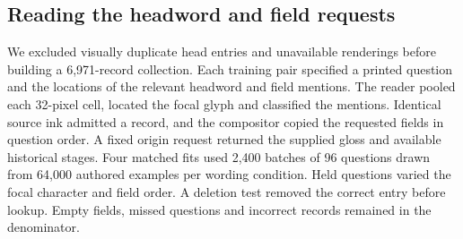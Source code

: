 \subsection*{Reading the headword and field requests}
We excluded visually duplicate head entries and unavailable renderings before building a 6,971-record collection. Each training pair specified a printed question and the locations of the relevant headword and field mentions. The reader pooled each 32-pixel cell, located the focal glyph and classified the mentions. Identical source ink admitted a record, and the compositor copied the requested fields in question order. A fixed origin request returned the supplied gloss and available historical stages. Four matched fits used 2,400 batches of 96 questions drawn from 64,000 authored examples per wording condition. Held questions varied the focal character and field order. A deletion test removed the correct entry before lookup. Empty fields, missed questions and incorrect records remained in the denominator.
